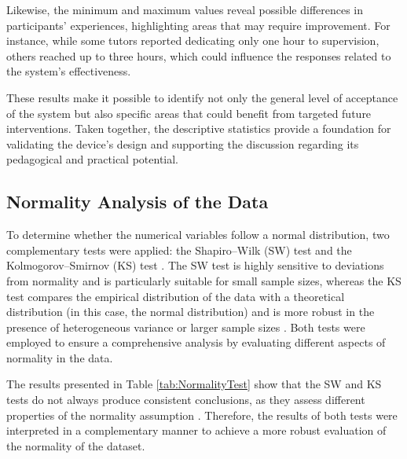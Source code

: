                 Likewise, the minimum and maximum values reveal possible differences in participants’ experiences, highlighting areas that may require improvement. For instance, while some tutors reported dedicating only one hour to supervision, others reached up to three hours, which could influence the responses related to the system’s effectiveness.
                
                These results make it possible to identify not only the general level of acceptance of the system but also specific areas that could benefit from targeted future interventions. Taken together, the descriptive statistics provide a foundation for validating the device’s design and supporting the discussion regarding its pedagogical and practical potential.
                
                \subsection{Normality Analysis of the Data}
                To determine whether the numerical variables follow a normal distribution, two complementary tests were applied: the Shapiro–Wilk (SW) test and the Kolmogorov–Smirnov (KS) test \citep{Correa2025Simulation}. The SW test is highly sensitive to deviations from normality and is particularly suitable for small sample sizes, whereas the KS test compares the empirical distribution of the data with a theoretical distribution (in this case, the normal distribution) and is more robust in the presence of heterogeneous variance or larger sample sizes \citep{Kobayashi2025Testing}. Both tests were employed to ensure a comprehensive analysis by evaluating different aspects of normality in the data.
                
                The results presented in Table \ref{tab:NormalityTest} show that the SW and KS tests do not always produce consistent conclusions, as they assess different properties of the normality assumption \citep{Correa2025Simulation}. Therefore, the results of both tests were interpreted in a complementary manner to achieve a more robust evaluation of the normality of the dataset.
                
